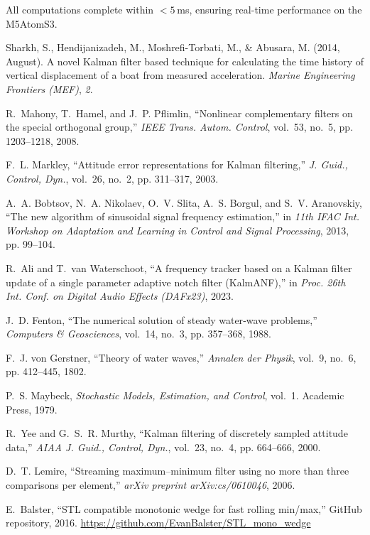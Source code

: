 \documentclass[12pt,letterpaper]{article}
\begin{document}
All computations complete within \(<5\) ms, ensuring real-time performance on the M5AtomS3.

\begin{thebibliography}{10}

Sharkh, S., Hendijanizadeh, M., Moshrefi-Torbati, M., \& Abusara, M. (2014, August). 
A novel Kalman filter based technique for calculating the time history of vertical displacement of a boat from measured acceleration. 
\textit{Marine Engineering Frontiers (MEF)}, \textit{2}.

R.~Mahony, T.~Hamel, and J.~P. Pflimlin, “Nonlinear complementary filters on the special orthogonal group,” \emph{IEEE Trans. Autom. Control}, vol.~53, no.~5, pp. 1203–1218, 2008.

F.~L. Markley, “Attitude error representations for Kalman filtering,” \emph{J. Guid., Control, Dyn.}, vol.~26, no.~2, pp. 311–317, 2003.

A.~A. Bobtsov, N.~A. Nikolaev, O.~V. Slita, A.~S. Borgul, and S.~V. Aranovskiy, “The new algorithm of sinusoidal signal frequency estimation,” in \emph{11th IFAC Int. Workshop on Adaptation and Learning in Control and Signal Processing}, 2013, pp. 99–104.

R.~Ali and T.~van Waterschoot, “A frequency tracker based on a Kalman filter update of a single parameter adaptive notch filter (KalmANF),” in \emph{Proc. 26th Int. Conf. on Digital Audio Effects (DAFx23)}, 2023.

J.~D. Fenton, “The numerical solution of steady water‐wave problems,” \emph{Computers \& Geosciences}, vol.~14, no.~3, pp. 357–368, 1988.

F.~J. von Gerstner, “Theory of water waves,” \emph{Annalen der Physik}, vol.~9, no.~6, pp. 412–445, 1802.

P.~S. Maybeck, \emph{Stochastic Models, Estimation, and Control}, vol.~1. Academic Press, 1979.

R.~Yee and G.~S.~R. Murthy, “Kalman filtering of discretely sampled attitude data,” \emph{AIAA J. Guid., Control, Dyn.}, vol.~23, no.~4, pp. 664–666, 2000.

D.~T. Lemire, “Streaming maximum–minimum filter using no more than three comparisons per element,” \emph{arXiv preprint arXiv:cs/0610046}, 2006.

E.~Balster, “STL compatible monotonic wedge for fast rolling min/max,” GitHub repository, 2016. \url{https://github.com/EvanBalster/STL_mono_wedge}

\end{thebibliography}
\end{document}
